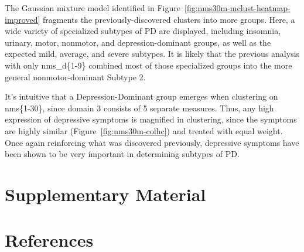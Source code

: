 \documentclass[preprint,3p,twocolumn]{elsarticle} %
\begin{document}
The Gaussian mixture model identified in Figure~\ref{fig:nms30m-mclust-heatmap-improved} fragments
the previously-discovered clusters into more groups. Here, a wide variety of specialized subtypes
of PD are displayed, including insomnia, urinary, motor, nonmotor, and depression-dominant groups,
as well as the expected mild, average, and severe subtypes. It is likely that the previous analysis
with only nms\_d\{1-9\} combined most of those specialized groups into the more general
nonmotor-dominant Subtype 2.

It's intuitive that a Depression-Dominant group emerges when clustering on nms\{1-30\}, since
domain 3 consists of 5 separate measures. Thus, any high expression of depressive symptoms is
magnified in clustering, since the symptoms are highly similar (Figure~\ref{fig:nms30m-colhc}) and
treated with equal weight. Once again reinforcing what was discovered previously, depressive
symptoms have been shown to be very important in determining subtypes of PD.

\section{Supplementary Material}
\section{References}


\end{document}
